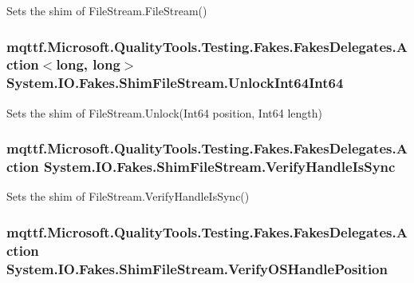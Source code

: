 Sets the shim of File\-Stream.\-File\-Stream()

\hypertarget{class_system_1_1_i_o_1_1_fakes_1_1_shim_file_stream_aaaff55aa9232c7b1085f5a3cd0c22992}{
\subsubsection[{Unlock\-Int64\-Int64}]{\setlength{\rightskip}{0pt plus 5cm}mqttf.\-Microsoft.\-Quality\-Tools.\-Testing.\-Fakes.\-Fakes\-Delegates.\-Action$<$long, long$>$ System.\-I\-O.\-Fakes.\-Shim\-File\-Stream.\-Unlock\-Int64\-Int64\hspace{0.3cm}{\ttfamily [set]}}}\label{class_system_1_1_i_o_1_1_fakes_1_1_shim_file_stream_aaaff55aa9232c7b1085f5a3cd0c22992}


Sets the shim of File\-Stream.\-Unlock(\-Int64 position, Int64 length)

\hypertarget{class_system_1_1_i_o_1_1_fakes_1_1_shim_file_stream_ac86c9514df54967abec11b3af01dd650}{
\subsubsection[{Verify\-Handle\-Is\-Sync}]{\setlength{\rightskip}{0pt plus 5cm}mqttf.\-Microsoft.\-Quality\-Tools.\-Testing.\-Fakes.\-Fakes\-Delegates.\-Action System.\-I\-O.\-Fakes.\-Shim\-File\-Stream.\-Verify\-Handle\-Is\-Sync\hspace{0.3cm}{\ttfamily [set]}}}\label{class_system_1_1_i_o_1_1_fakes_1_1_shim_file_stream_ac86c9514df54967abec11b3af01dd650}


Sets the shim of File\-Stream.\-Verify\-Handle\-Is\-Sync()

\hypertarget{class_system_1_1_i_o_1_1_fakes_1_1_shim_file_stream_a07f680eb28fe0b5348bd623939e1ad59}{
\subsubsection[{Verify\-O\-S\-Handle\-Position}]{\setlength{\rightskip}{0pt plus 5cm}mqttf.\-Microsoft.\-Quality\-Tools.\-Testing.\-Fakes.\-Fakes\-Delegates.\-Action System.\-I\-O.\-Fakes.\-Shim\-File\-Stream.\-Verify\-O\-S\-Handle\-Position\hspace{0.3cm}{\ttfamily [set]}}}\label{class_system_1_1_i_o_1_1_fakes_1_1_shim_file_stream_a07f680eb28fe0b5348bd623939e1ad59}


